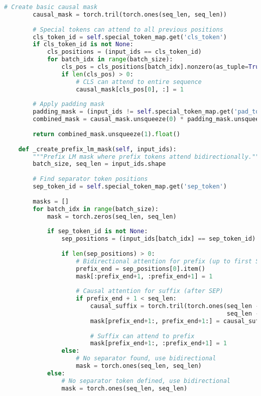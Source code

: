 \begin{lstlisting}[language=Python, caption=Comprehensive attention mask generator for special tokens]
        # Create basic causal mask
        causal_mask = torch.tril(torch.ones(seq_len, seq_len))
        
        # Special tokens can attend to all previous positions
        cls_token_id = self.special_token_map.get('cls_token')
        if cls_token_id is not None:
            cls_positions = (input_ids == cls_token_id)
            for batch_idx in range(batch_size):
                cls_pos = cls_positions[batch_idx].nonzero(as_tuple=True)[0]
                if len(cls_pos) > 0:
                    # CLS can attend to entire sequence
                    causal_mask[cls_pos[0], :] = 1
                    
        # Apply padding mask
        padding_mask = (input_ids != self.special_token_map.get('pad_token', -1))
        combined_mask = causal_mask.unsqueeze(0) * padding_mask.unsqueeze(1)
        
        return combined_mask.unsqueeze(1).float()
        
    def _create_prefix_lm_mask(self, input_ids):
        """Prefix LM mask where prefix tokens attend bidirectionally."""
        batch_size, seq_len = input_ids.shape
        
        # Find separator token positions
        sep_token_id = self.special_token_map.get('sep_token')
        
        masks = []
        for batch_idx in range(batch_size):
            mask = torch.zeros(seq_len, seq_len)
            
            if sep_token_id is not None:
                sep_positions = (input_ids[batch_idx] == sep_token_id).nonzero(as_tuple=True)[0]
                
                if len(sep_positions) > 0:
                    # Bidirectional attention for prefix (up to first SEP)
                    prefix_end = sep_positions[0].item()
                    mask[:prefix_end+1, :prefix_end+1] = 1
                    
                    # Causal attention for suffix (after SEP)
                    if prefix_end + 1 < seq_len:
                        causal_suffix = torch.tril(torch.ones(seq_len - prefix_end - 1, 
                                                              seq_len - prefix_end - 1))
                        mask[prefix_end+1:, prefix_end+1:] = causal_suffix
                        
                        # Suffix can attend to prefix
                        mask[prefix_end+1:, :prefix_end+1] = 1
                else:
                    # No separator found, use bidirectional
                    mask = torch.ones(seq_len, seq_len)
            else:
                # No separator token defined, use bidirectional
                mask = torch.ones(seq_len, seq_len)
                

\end{lstlisting}

